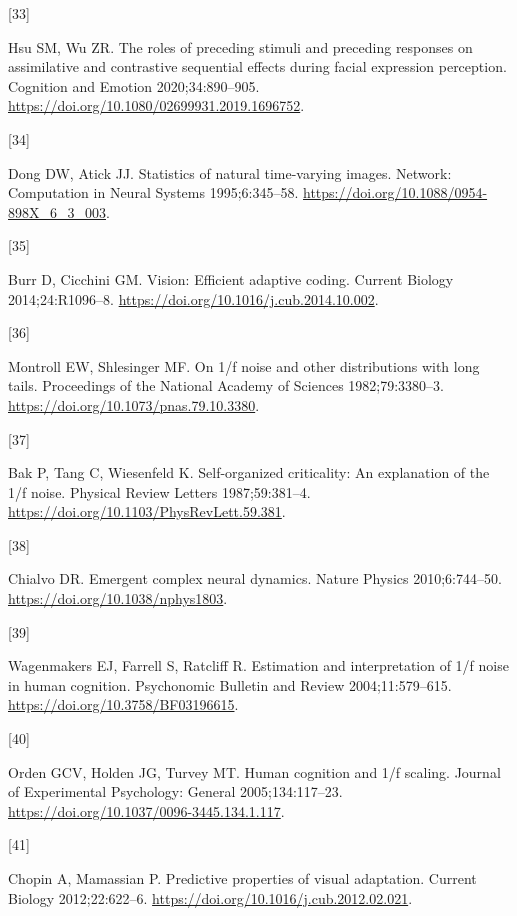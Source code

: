 \documentclass[
]{article}
\newlength{\cslhangindent}
\newlength{\csllabelwidth}
\newlength{\cslentryspacingunit} %
\newenvironment{CSLReferences}[2] %
 {%
  \setlength{\parindent}{0pt}
  \ifodd #1
  \let\oldpar\par
  \def\par{\hangindent=\cslhangindent\oldpar}
  \fi
  \setlength{\parskip}{#2\cslentryspacingunit}
 }%
 {}
\newcommand{\CSLLeftMargin}[1]{\parbox[t]{\csllabelwidth}{#1}}
\newcommand{\CSLRightInline}[1]{\parbox[t]{\linewidth - \csllabelwidth}{#1}\break}
\begin{document}
\begin{CSLReferences}{0}{0}
\leavevmode{}%
\CSLLeftMargin{{[}33{]} }%
\CSLRightInline{Hsu SM, Wu ZR. The roles of preceding stimuli and
preceding responses on assimilative and contrastive sequential effects
during facial expression perception. Cognition and Emotion
2020;34:890--905. \url{https://doi.org/10.1080/02699931.2019.1696752}.}

\leavevmode{}%
\CSLLeftMargin{{[}34{]} }%
\CSLRightInline{Dong DW, Atick JJ. Statistics of natural time-varying
images. Network: Computation in Neural Systems 1995;6:345--58.
\url{https://doi.org/10.1088/0954-898X_6_3_003}.}

\leavevmode{}%
\CSLLeftMargin{{[}35{]} }%
\CSLRightInline{Burr D, Cicchini GM. Vision: Efficient adaptive coding.
Current Biology 2014;24:R1096--8.
\url{https://doi.org/10.1016/j.cub.2014.10.002}.}

\leavevmode{}%
\CSLLeftMargin{{[}36{]} }%
\CSLRightInline{Montroll EW, Shlesinger MF. On 1/f noise and other
distributions with long tails. Proceedings of the National Academy of
Sciences 1982;79:3380--3.
\url{https://doi.org/10.1073/pnas.79.10.3380}.}

\leavevmode{}%
\CSLLeftMargin{{[}37{]} }%
\CSLRightInline{Bak P, Tang C, Wiesenfeld K. Self-organized criticality:
An explanation of the 1/f noise. Physical Review Letters 1987;59:381--4.
\url{https://doi.org/10.1103/PhysRevLett.59.381}.}

\leavevmode{}%
\CSLLeftMargin{{[}38{]} }%
\CSLRightInline{Chialvo DR. Emergent complex neural dynamics. Nature
Physics 2010;6:744--50. \url{https://doi.org/10.1038/nphys1803}.}

\leavevmode{}%
\CSLLeftMargin{{[}39{]} }%
\CSLRightInline{Wagenmakers EJ, Farrell S, Ratcliff R. Estimation and
interpretation of 1/f noise in human cognition. Psychonomic Bulletin and
Review 2004;11:579--615. \url{https://doi.org/10.3758/BF03196615}.}

\leavevmode{}%
\CSLLeftMargin{{[}40{]} }%
\CSLRightInline{Orden GCV, Holden JG, Turvey MT. Human cognition and 1/f
scaling. Journal of Experimental Psychology: General 2005;134:117--23.
\url{https://doi.org/10.1037/0096-3445.134.1.117}.}

\leavevmode{}%
\CSLLeftMargin{{[}41{]} }%
\CSLRightInline{Chopin A, Mamassian P. Predictive properties of visual
adaptation. Current Biology 2012;22:622--6.
\url{https://doi.org/10.1016/j.cub.2012.02.021}.}


\end{CSLReferences}
\end{document}
